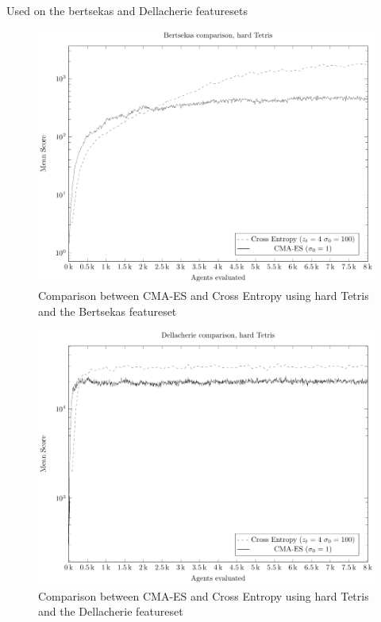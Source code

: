 
Used on the bertsekas and Dellacherie featuresets

\begin{figure}[H]
\includegraphics[scale=1]{plots/plotBertsekasCmaVsCEHardTetris}
\caption{Comparison between CMA-ES and Cross Entropy 
using hard Tetris and the Bertsekas featureset }
\end{figure}

\begin{figure}[H]
\includegraphics[scale=1]{plots/plotDellCmaVsCEHardTetris}
\caption{Comparison between CMA-ES and Cross Entropy 
using hard Tetris and the Dellacherie featureset}
\end{figure}

